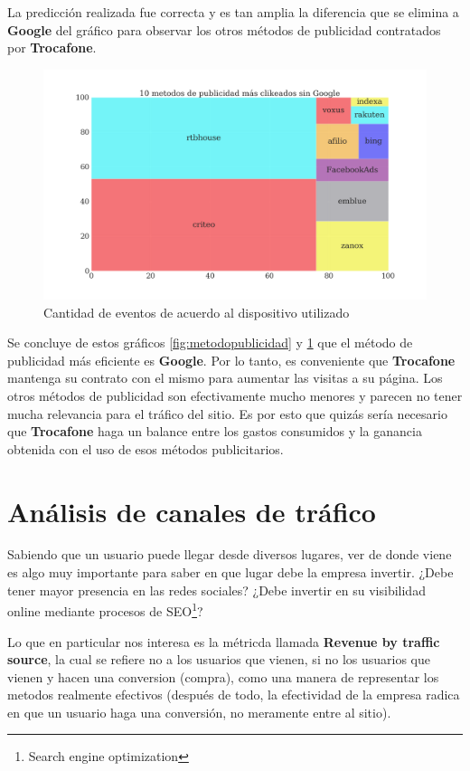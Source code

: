 \documentclass[a4paper]{article}
\begin{document}
La predicción realizada fue correcta y es tan amplia la diferencia que se elimina a \textbf{Google} del gráfico para observar los otros métodos de publicidad contratados por \textbf{Trocafone}.

\begin{figure}[h!]
	\includegraphics[width=\linewidth]{figures/171-publicidad_sin_google-barplot.png}
	\caption{Cantidad de eventos de acuerdo al dispositivo utilizado}
	\label{fig:metodopublicidadsingoogle}
\end{figure}

Se concluye de estos gráficos \ref{fig:metodopublicidad} y \ref{fig:metodopublicidadsingoogle} que el método de publicidad más eficiente es \textbf{Google}. Por lo tanto, es conveniente que \textbf{Trocafone} mantenga su contrato con el mismo para aumentar las visitas a su página. Los otros métodos de publicidad son efectivamente mucho menores y parecen no tener mucha relevancia para el tráfico del sitio. Es por esto que quizás sería necesario que \textbf{Trocafone} haga un balance entre los gastos consumidos y la ganancia obtenida con el uso de esos métodos publicitarios.

\section{Análisis de canales de tráfico}

Sabiendo que un usuario puede llegar desde diversos lugares, ver de donde viene es algo muy importante para saber en que lugar debe la empresa invertir. ¿Debe tener mayor presencia en las redes sociales? ¿Debe invertir en su visibilidad online mediante procesos de SEO\footnote{Search engine optimization}? 

Lo que en particular nos interesa es la métricda llamada \textbf{Revenue by traffic source}, la cual se refiere no a los usuarios que vienen, si no los usuarios que vienen y hacen una conversion (compra), como una manera de representar los metodos realmente efectivos (después de todo, la efectividad de la empresa radica en que un usuario haga una conversión, no meramente entre al sitio).
\end{document}
